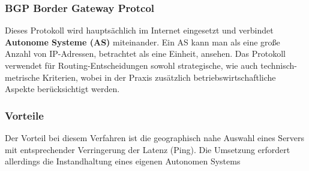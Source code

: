 \subsubsection{BGP Border Gateway Protcol}\cite{BGP}
Dieses Protokoll wird hauptsächlich im Internet eingesetzt und verbindet\textbf{ Autonome Systeme (AS)} miteinander. Ein AS kann man als eine große Anzahl von IP-Adressen, betrachtet als eine Einheit, ansehen. Das Protokoll verwendet für Routing-Entscheidungen sowohl strategische, wie auch technisch-metrische Kriterien, wobei in der Praxis zusätzlich betriebswirtschaftliche Aspekte berücksichtigt werden.

\subsubsection{Vorteile}
Der Vorteil bei diesem Verfahren ist die geographisch nahe Auswahl eines Servers mit entsprechender Verringerung der Latenz (Ping). Die Umsetzung erfordert allerdings die Instandhaltung eines eigenen Autonomen Systems



